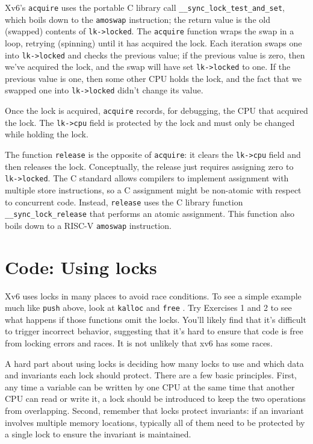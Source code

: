 Xv6's 
\lstinline{acquire}
uses the portable C library call 
\lstinline{__sync_lock_test_and_set},
which boils down to the
\lstinline{amoswap}
instruction;
the return value is the old (swapped) contents of
\lstinline{lk->locked}.
The
\lstinline{acquire}
function wraps the swap in a loop, retrying (spinning) until it has
acquired the lock.
Each iteration swaps one into
\lstinline{lk->locked} 
and checks the previous value;
if the previous value is zero, then we've acquired the
lock, and the swap will have set 
\lstinline{lk->locked}
to one.
If the previous value is one, then some other CPU
holds the lock, and the fact that we swapped one into
\lstinline{lk->locked}
didn't change its value.

Once the lock is acquired,
\lstinline{acquire}
records, for debugging, the CPU 
that acquired the lock.
The
\lstinline{lk->cpu}
field is protected by the lock
and must only be changed while holding the lock.

The function
\lstinline{release}
is the opposite of 
\lstinline{acquire}:
it clears the 
\lstinline{lk->cpu}
field
and then releases the lock.
Conceptually, the release just requires assigning zero to
\lstinline{lk->locked}.
The C standard allows compilers to implement assignment
with multiple store instructions,
so a C assignment might be non-atomic with respect
to concurrent code.
Instead,
\lstinline{release}
uses the C library function
\lstinline{__sync_lock_release}
that performs an atomic assignment.
This function also boils down to a RISC-V
\lstinline{amoswap}
instruction.
\section{Code: Using locks}
Xv6 uses locks in many places to avoid race conditions.
To see a simple example much like
\lstinline{push}
above,
look at
\lstinline{kalloc}
and
\lstinline{free}
.
Try Exercises 1 and 2 to see what happens if those
functions omit the locks.
You'll likely find that it's difficult to trigger incorrect
behavior, suggesting that it's hard to ensure that code
is free from locking errors and races.
It is not unlikely that xv6 has some races.

A hard part about using locks is deciding how many locks
to use and which data and invariants each lock should protect.
There are a few basic principles.
First, any time a variable can be written by one CPU
at the same time that another CPU can read or write it,
a lock should be introduced to keep the two
operations from overlapping.
Second, remember that locks protect invariants:
if an invariant involves multiple memory locations,
typically all of them need to be protected
by a single lock to ensure the invariant is maintained.


